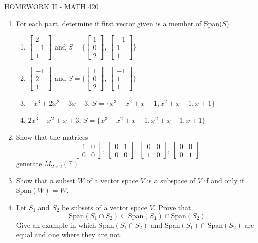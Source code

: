 \documentclass{article}
\begin{document}
\centerline{HOMEWORK II - MATH 420}
\begin{enumerate}
\item
For each part, determine if first vector given is a member of Span($S$).
\begin{enumerate}
\item $\left[\begin{array}{c}
2\\-1\\1\end{array}\right]$ and $S=\{\left[\begin{array}{c}
1\\0\\2\end{array}\right], \ \left[ \begin{array}{c}
-1\\1\\1\end{array}\right]\}$
\item $\left[\begin{array}{c}
-1\\2\\1\end{array}\right]$ and $S=\{\left[\begin{array}{c}
1\\0\\2\end{array}\right], \ \left[ \begin{array}{c}
-1\\1\\1\end{array}\right]\}$
\item $-x^3+2x^2+3x+3$, $S=\{x^3+x^2+x+1,x^2+x+1,x+1\}$
\item  $2x^3-x^2+x+3$, $S=\{x^3+x^2+x+1,x^2+x+1,x+1\}$
\end{enumerate}

\item Show that the matrices
 $$\left[\begin{array}{cc}
1&0\\0&0\end{array}\right],\ 
\left[\begin{array}{cc}
0&1\\0&0\end{array}\right],\
\left[\begin{array}{cc}
0&0\\1&0\end{array}\right], \
\left[\begin{array}{cc}
0&0\\0&1\end{array}\right]
 $$
 generate $M_{2\times 2}(\mathbb{F})$
 

\item Show that a subset $W$ of a vector space $V$ is a subspace of $V$ if and only if Span$(W)=W$.

 \item Let $S_1$  and $S_2$
 be subsets of a vector space $V$. Prove that
$$\mbox{Span}(S_1\cap S_2)\subseteq \mbox{Span}(S_1)\cap \mbox{Span}(S_2)$$ Give an example in which Span$(S_1\cap S_2)$ and  Span$(S_1)\cap $Span$(S_2)$ are equal and one where they are not.

     \end{enumerate}
     
\end{document}
